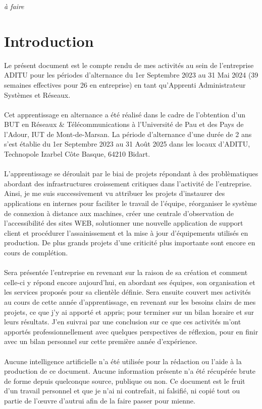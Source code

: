 \begin{sloppypar}
\textit{à faire}

\newpage
\renewcommand*\contentsname{Table des matières}
\tableofcontents

\newpage
\setcounter{page}{1}
\pagestyle{plain}
\section{Introduction}

Le présent document est le compte rendu de mes activités au sein de l’entreprise ADITU pour les périodes d’alternance du 1er Septembre 2023 au 31 Mai 2024 (39 semaines effectives pour 26 en entreprise) en tant qu’Apprenti Administrateur Systèmes et Réseaux.
\\ \\
Cet apprentissage en alternance a été réalisé dans le cadre de l’obtention d’un BUT en Réseaux \& Télécommunications à l’Université de Pau et des Pays de l’Adour, IUT de Mont-de-Marsan. La période d’alternance d’une durée de 2 ans s’est établie du 1er Septembre 2023 au 31 Août 2025 dans les locaux d’ADITU, Technopole Izarbel Côte Basque, 64210 Bidart.
\\ \\
L'apprentissage se déroulait par le biai de projets répondant à des problèmatiques abordant des infrastructures croissement critiques dans l'activité de l'entreprise. Ainsi, je me suis successivement vu attribuer les projets d'instaurer des applications en internes pour faciliter le travail de l'équipe, réorganiser le système de connexion à distance aux machines, créer une centrale d'observation de l'accessibilité des sites WEB, solutionner une nouvelle application de support client et procédurer l'assainissement et la mise à jour d'équipements utilisés en production. De plus grands projets d'une criticité plus importante sont encore en cours de complétion.
\\ \\
Sera présentée l'entreprise en revenant sur la raison de sa création et comment celle-ci y répond encore aujourd'hui, en abordant ses équipes, son organisation et les services proposés pour sa clientèle définie. Sera ensuite couvert mes activités au cours de cette année d'apprentissage, en revenant sur les besoins clairs de mes projets, ce que j'y ai apporté et appris; pour terminer sur un bilan horaire et sur leurs résultats. J'en suivrai par une conclusion sur ce que ces activités m'ont apportés professionnellement avec quelques perspectives de réflexion, pour en finir avec un bilan personnel sur cette première année d'expérience.
\\ \\
Aucune intelligence artificielle n’a été utilisée pour la rédaction ou l’aide à la production de ce document. Aucune information présente n’a été récupérée brute de forme depuis quelconque source, publique ou non. Ce document est le fruit d’un travail personnel et que je n’ai ni contrefait, ni falsifié, ni copié tout ou partie de l’œuvre d’autrui afin de la faire passer pour mienne.


\end{sloppypar}
